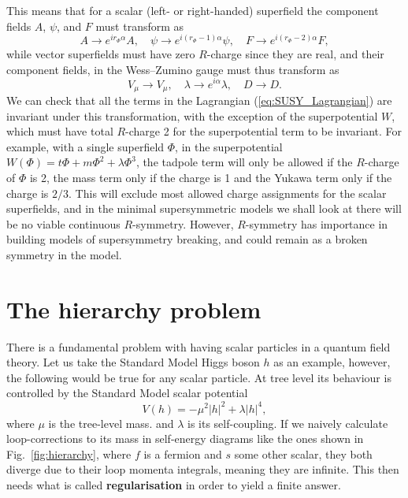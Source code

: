 \documentclass[notes.tex]{subfiles}
\begin{document}
This means that for a scalar (left- or right-handed) superfield the component fields $A$, $\psi$, and $F$ must transform as
\begin{equation}
A\to e^{ir_\Phi\alpha}A,\quad \psi\to e^{i(r_\Phi-1)\alpha} \psi,\quad F\to e^{i(r_\Phi-2)\alpha} F,
\end{equation}
while vector superfields must have zero $R$-charge since they are real, and their component fields, in the Wess--Zumino gauge must thus transform as
\begin{equation}
V_\mu \to V_\mu ,\quad \lambda \to e^{i\alpha} \lambda,\quad D\to D.
\end{equation}
We can check that all the terms in the Lagrangian (\ref{eq:SUSY_Lagrangian}) are invariant under this transformation, with the exception of the superpotential $W$, which must have total $R$-charge 2 for the superpotential term to be invariant. For example, with a single superfield $\Phi$, in the superpotential $W(\Phi)=t\Phi+m\Phi^2+\lambda\Phi^3$, the tadpole term will only be allowed if the $R$-charge of $\Phi$ is 2, the mass term only if the charge is 1 and the Yukawa term only if the charge is $2/3$.
This will exclude most allowed charge assignments for the scalar superfields, and in the minimal supersymmetric models we shall look at there will be no viable continuous $R$-symmetry. However, $R$-symmetry has importance in building models of supersymmetry breaking, and could remain as a broken symmetry in the model.



\section{The hierarchy problem}
There is a fundamental problem with having scalar particles in a quantum field theory. Let us take the Standard Model Higgs boson $h$ as an example, however, the following would be true for any scalar particle. At tree level its behaviour is controlled by the Standard Model scalar potential
\begin{equation}
V(h)=-\mu^2|h|^2+\lambda |h|^4,
\label{eq:SM_Higgs_potential}
\end{equation}
where $\mu$ is the tree-level mass. and $\lambda$ is its self-coupling. If we naively calculate loop-corrections to its mass in self-energy diagrams like the ones shown in Fig.~\ref{fig:hierarchy}, where $f$ is a fermion and $s$ some other scalar, they both diverge due to their loop momenta integrals, meaning they are infinite. This then needs what is called {\bf regularisation} in order to yield a finite answer. 
\end{document}
